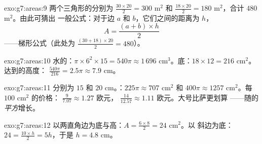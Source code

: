 \begin{solution}{exo:g7:areas:9}
两个三角形的分别为 $\frac{30 \times 20}{2} = 300$ m$^2$
和 $\frac{18 \times 20}{2} = 180$ m$^2$，合计 $480$ m$^2$。由此可猜出
一般公式：对于边 $a$ 和 $b$，它们之间的距离为 $h$，
\[
A = \frac{(a + b) \times h}{2}
\]
——梯形公式（此处为 $\frac{(30+18)\times 20}{2} = 480$）。
\end{solution}

\begin{solution}{exo:g7:areas:10}
水的：$\pi \times 6^2 \times 15 = 540\pi \approx 1\,696$
cm$^3$。底：$18 \times 12 = 216$ cm$^2$。达到的高度：
$\frac{540\pi}{216} = 2.5\pi \approx 7.9$ cm。
\end{solution}

\begin{solution}{exo:g7:areas:11}
分别为 $15$ 和 $20$ cm。：$225\pi \approx 707$ cm$^2$ 和
$400\pi \approx 1257$ cm$^2$。每 $100$ cm$^2$ 的价格：
$\frac{9}{7.07} \approx 1.27$ 欧元，
$\frac{14}{12.57} \approx 1.11$ 欧元。大号比萨更划算
——随的\emph{平方}增长。
\end{solution}

\begin{solution}{exo:g7:areas:12}
以两直角边为底与高：$A = \frac{6 \times 8}{2} = 24$ cm$^2$。以
斜边为底：$24 = \frac{10 \times h}{2} = 5h$，于是
$h = 4.8$ cm。
\end{solution}

